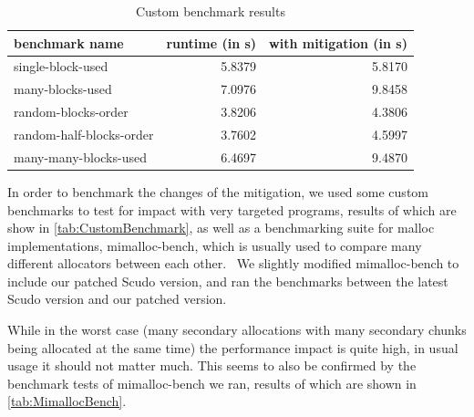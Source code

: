 \documentclass[a4paper,11pt,oneside]{report}
\begin{document}
\begin{longtable}[h]{l r r}
  \caption{Custom benchmark results}\label{tab:CustomBenchmark} \\
  
  \toprule
  benchmark name           & runtime (in s) & with mitigation (in s) \\
  \midrule
  \endhead{}
  single-block-used        & 5.8379         & 5.8170                 \\
  \midrule
  many-blocks-used         & 7.0976         & 9.8458                 \\
  \midrule
  random-blocks-order      & 3.8206         & 4.3806                 \\
  \midrule
  random-half-blocks-order & 3.7602         & 4.5997                 \\
  \midrule
  many-many-blocks-used    & 6.4697         & 9.4870                 \\
  \bottomrule
\end{longtable}

In order to benchmark the changes of the mitigation, we used some custom benchmarks to
test for impact with very targeted programs, results of which are show in
\autoref{tab:CustomBenchmark}, as well as a benchmarking suite for malloc implementations,
mimalloc-bench, which is usually used to compare many different allocators between each
other.~\cite{mimalloc-bench} We slightly modified mimalloc-bench to include our patched
Scudo version, and ran the benchmarks between the latest Scudo version and our patched
version.

While in the worst case (many secondary allocations with many secondary chunks being
allocated at the same time) the performance impact is quite high, in usual usage it should
not matter much. This seems to also be confirmed by the benchmark tests of mimalloc-bench
we ran, results of which are shown in \autoref{tab:MimallocBench}.
\end{document}
